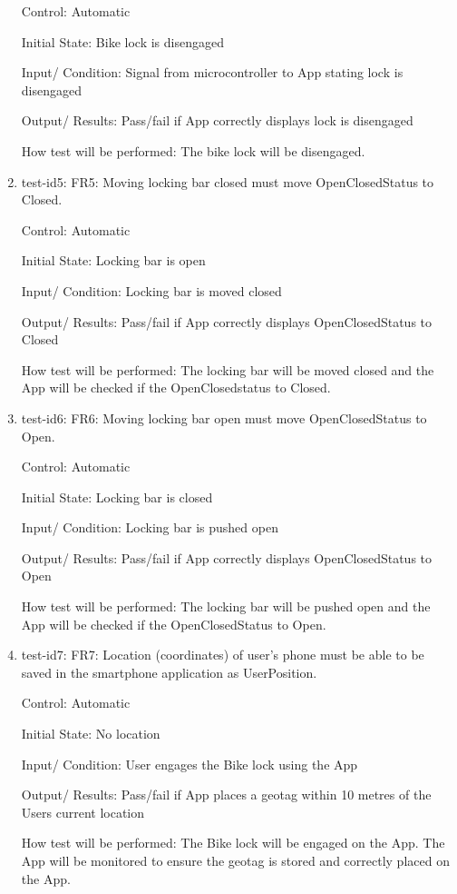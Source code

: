 \documentclass[12pt, titlepage]{article}
\begin{document}
\begin{enumerate}
Control: Automatic 

Initial State: Bike lock is disengaged 

Input/ Condition: Signal from microcontroller to App stating lock is disengaged 

Output/ Results: Pass/fail if App correctly displays lock is disengaged 

How test will be performed: The bike lock will be disengaged. 

\item{test-id5: FR5: Moving locking bar closed must move OpenClosedStatus to Closed. \\} 

Control: Automatic 

Initial State: Locking bar is open 

Input/ Condition: Locking bar is moved closed 

Output/ Results: Pass/fail if App correctly displays OpenClosedStatus to Closed 

How test will be performed: The locking bar will be moved closed and the App will be checked if the OpenClosedstatus to Closed. 

\item{test-id6: FR6: Moving locking bar open must move OpenClosedStatus to Open. \\} 

Control: Automatic 

Initial State: Locking bar is closed 

Input/ Condition: Locking bar is pushed open 

Output/ Results: Pass/fail if App correctly displays OpenClosedStatus to Open 

How test will be performed: The locking bar will be pushed open and the App will be checked if the OpenClosedStatus to Open. 
 
\item{test-id7: FR7: Location (coordinates) of user’s phone must be able to be saved in the smartphone application as UserPosition. \\} 

Control: Automatic 

Initial State: No location  

Input/ Condition: User engages the Bike lock using the App 

Output/ Results: Pass/fail if App places a geotag within 10 metres of the Users current location 

How test will be performed: The Bike lock will be engaged on the App. The App will be monitored to ensure the geotag is stored and correctly placed on the App.  


\end{enumerate}
\end{document}
